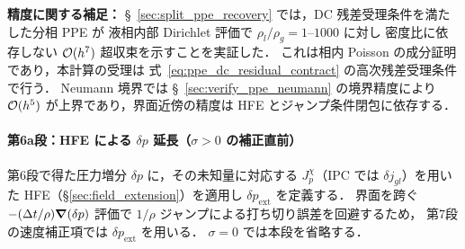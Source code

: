 \noindent\textbf{精度に関する補足：}
§~\ref{sec:split_ppe_recovery} では，DC 残差受理条件を満たした分相 PPE が
液相内部 Dirichlet 評価で $\rho_l/\rho_g = 1$--$1000$ に対し
密度比に依存しない $\mathcal{O}(h^7)$ 超収束を示すことを実証した．
これは相内 Poisson の成分証明であり，本計算の受理は
式~\eqref{eq:ppe_dc_residual_contract} の高次残差受理条件で行う．
Neumann 境界では §~\ref{sec:verify_ppe_neumann} の境界精度により
$\mathcal{O}(h^5)$ が上界であり，界面近傍の精度は HFE とジャンプ条件閉包に依存する．

\paragraph{第6a段：HFE による $\delta p$ 延長（$\sigma>0$ の補正直前）}
第6段で得た圧力増分 $\delta p$ に，その未知量に対応する
$J_p^\chi$（IPC では $\delta j_{gl}$）を用いた HFE（§\ref{sec:field_extension}）を適用し
$\delta p_{\mathrm{ext}}$ を定義する．
界面を跨ぐ $-(\Delta t/\rho)\bm{\nabla}(\delta p)$ 評価で
$1/\rho$ ジャンプによる打ち切り誤差を回避するため，
第7段の速度補正項では $\delta p_{\mathrm{ext}}$ を用いる．
$\sigma=0$ では本段を省略する．

